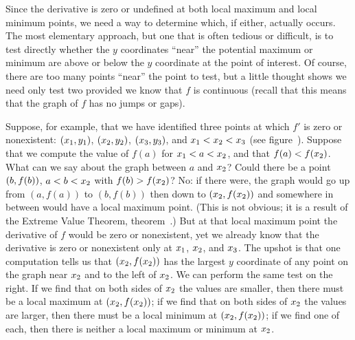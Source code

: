 
Since the derivative is zero or undefined at both local maximum and
local minimum points, we need a way to determine which, if either,
actually occurs. The most
elementary approach, but one that is often tedious or difficult, is to
test directly whether the $y$ coordinates ``near'' the potential
maximum or minimum are above or below the $y$ coordinate at the point
of interest. Of course, there are too many points ``near'' the point
to test, but a little thought shows we need only test two provided we
know that $f$ is continuous (recall that this means that the graph of
$f$ has no jumps or gaps).

Suppose, for example, that we have identified three points at which
$f'$ is zero or nonexistent: $\displaystyle (x_1,y_1)$, $\displaystyle (x_2,y_2)$, $\displaystyle (x_3,y_3)$,
and $\displaystyle x_1<x_2<x_3$ (see figure~). Suppose that we compute the value of $f(a)$ for $\displaystyle x_1<a<x_2$, and
that $\displaystyle f(a)<f(x_2)$. What can we say about the graph between $a$ and
$\displaystyle x_2$? Could there be a point $\displaystyle (b,f(b))$, $\displaystyle a<b<x_2$ with
$\displaystyle f(b)>f(x_2)$? No: if there were, the graph would go up from
$(a,f(a))$ to $(b,f(b))$ then down to $\displaystyle (x_2,f(x_2))$ and somewhere in
between would have a local maximum point. (This is not obvious; it is
a result of the Extreme Value Theorem, theorem~.)
But at that local maximum
point the derivative of $f$ would be zero or nonexistent, yet we
already know that the derivative is zero or nonexistent only at $\displaystyle x_1$,
$\displaystyle x_2$, and $\displaystyle x_3$. The upshot is that one computation tells us that
$\displaystyle (x_2,f(x_2))$ has the largest $y$ coordinate of any point on the
graph near $\displaystyle x_2$ and to the left of $\displaystyle x_2$. We can perform the same
test on the right. If we find that on both sides of $\displaystyle x_2$ the values
are smaller, then there must be a local maximum at $\displaystyle (x_2,f(x_2))$; if
we find that on both sides of $\displaystyle x_2$ the values are larger, then there
must be a local minimum at $\displaystyle (x_2,f(x_2))$; if we find one of each,
then there is neither a local maximum or minimum at $\displaystyle x_2$.

